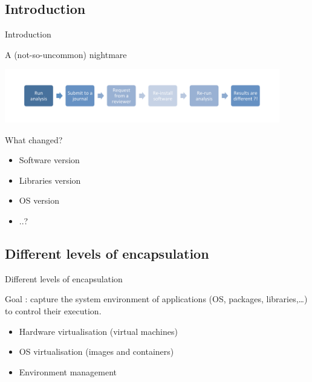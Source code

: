 \subsection{Introduction}


\begin{frame}{Introduction}

\begin{center}
A (not-so-uncommon) nightmare

\includegraphics[width=12cm]{02_encapsulation/figures/nightmare.pdf}

What changed?
\end{center} \pause

\begin{itemize}
  \item Software version
  \item Libraries version
  \item OS version
  \item ..?
\end{itemize}

\end{frame}


\subsection{Different levels of encapsulation}

\begin{frame}{Different levels of encapsulation}


Goal : capture the system environment of applications (OS, packages, libraries,…) to control their execution.

\begin{itemize}
  \item Hardware virtualisation (virtual machines) \logoVirtualbox 
  \item OS virtualisation (images and containers) \logoDockerPortrait
  \item Environment management \logoConda
\end{itemize}

\end{frame}

